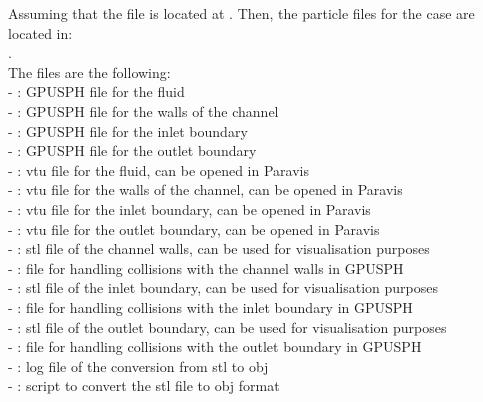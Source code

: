 \documentclass{../GPUSPHtemplate}
\begin{document}
\begin{enumerate}
\begin{itemize}
    Assuming that the  file is located at .
    Then, the particle files for the case are located in:\\
    . \\
    The files are the following:\\
    - :  GPUSPH file for the fluid\\
    - : GPUSPH file for the walls of the channel\\
    - : GPUSPH file for the inlet boundary\\
    - : GPUSPH file for the outlet boundary\\
    - :  vtu file for the fluid, can be opened in Paravis\\
    - : vtu file for the walls of the channel, can be opened in Paravis\\
    - : vtu file for the inlet boundary, can be opened in Paravis\\
    - : vtu file for the outlet boundary, can be opened in Paravis\\
    - : stl file of the channel walls, can be used for visualisation purposes\\
    - : file for handling collisions with the channel walls in GPUSPH\\
    - : stl file of the inlet boundary, can be used for visualisation purposes\\
    - : file for handling collisions with the inlet boundary in GPUSPH\\
    - : stl file of the outlet boundary, can be used for visualisation purposes\\
    - : file for handling collisions with the outlet boundary in GPUSPH\\
    - : log file of the conversion from stl to obj\\
    - : script to convert the stl file to obj format
  \end{itemize}
  

\end{enumerate}
\end{document}
